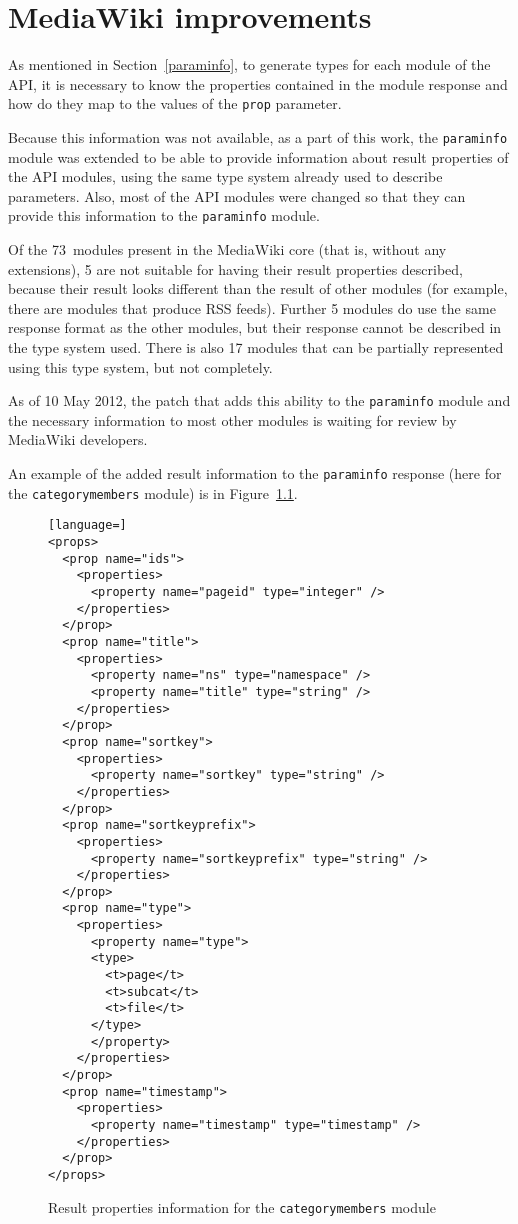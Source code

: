 \chapter{MediaWiki improvements}
\label{mw improvements}

As mentioned in Section~\ref{paraminfo}, to generate types for each module of the API,
it is necessary to know the properties contained in the module response
and how do they map to the values of the \texttt{prop} parameter.

Because this information was not available, as a part of this work,
the \texttt{paraminfo} module was extended to be able to provide information about result properties
of the API modules, using the same type system already used to describe parameters.
Also, most of the API modules were changed so that they can provide this information to the \texttt{paraminfo} module.

Of the 73~modules present in the MediaWiki core (that is, without any extensions),
5 are not suitable for having their result properties described,
because their result looks different than the result of other modules (for example, there are modules that produce RSS feeds).
Further 5 modules do use the same response format as the other modules,
but their response cannot be described in the type system used.
There is also 17 modules that can be partially represented using this type system, but not completely.

As of 10 May 2012, the patch that adds this ability to the \texttt{paraminfo} module and the necessary
information to most other modules is waiting for review by MediaWiki developers.

An example of the added result information to the \texttt{paraminfo} response (here for the \texttt{categorymembers} module) is in Figure~\ref{paraminfo props}.

\medskip

\begin{figure}[htbp]

\begin{lstlisting}[language=]
<props>
  <prop name="ids">
    <properties>
      <property name="pageid" type="integer" />
    </properties>
  </prop>
  <prop name="title">
    <properties>
      <property name="ns" type="namespace" />
      <property name="title" type="string" />
    </properties>
  </prop>
  <prop name="sortkey">
    <properties>
      <property name="sortkey" type="string" />
    </properties>
  </prop>
  <prop name="sortkeyprefix">
    <properties>
      <property name="sortkeyprefix" type="string" />
    </properties>
  </prop>
  <prop name="type">
    <properties>
      <property name="type">
      <type>
        <t>page</t>
        <t>subcat</t>
        <t>file</t>
      </type>
      </property>
    </properties>
  </prop>
  <prop name="timestamp">
    <properties>
      <property name="timestamp" type="timestamp" />
    </properties>
  </prop>
</props>
\end{lstlisting}

\caption{Result properties information for the \texttt{categorymembers} module}
\label{paraminfo props}
\end{figure}

